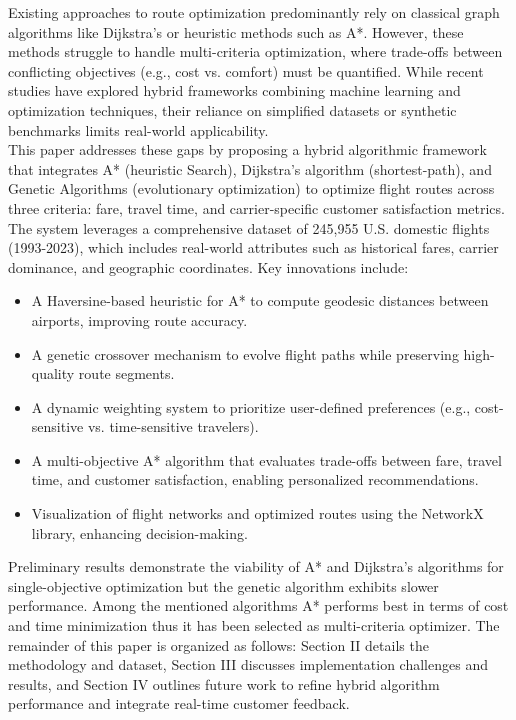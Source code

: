 \documentclass[conference]{IEEEtran}
\begin{document}
Existing approaches to route optimization predominantly rely on classical graph algorithms like Dijkstra's or heuristic methods such as A*. 
However, these methods struggle to handle multi-criteria optimization, where trade-offs between conflicting objectives (e.g., cost vs. comfort) must be quantified. 
While recent studies have explored hybrid frameworks combining machine learning and optimization techniques, their reliance on simplified datasets or synthetic benchmarks limits real-world applicability.\\

This paper addresses these gaps by proposing a hybrid algorithmic framework that integrates A* (heuristic Search), Dijkstra's algorithm (shortest-path), and Genetic Algorithms (evolutionary optimization) to optimize flight routes across three criteria: fare, travel time, and carrier-specific customer satisfaction metrics. 
The system leverages a comprehensive dataset of 245,955 U.S. domestic flights (1993-2023), which includes real-world attributes such as historical fares, carrier dominance, and geographic coordinates. 
Key innovations include:
\begin{itemize}
    \item A Haversine-based heuristic for A* to compute geodesic distances between airports, improving route accuracy.
    \item A genetic crossover mechanism to evolve flight paths while preserving high-quality route segments.
    \item A dynamic weighting system to prioritize user-defined preferences (e.g., cost-sensitive vs. time-sensitive travelers).
    \item A multi-objective A* algorithm that evaluates trade-offs between fare, travel time, and customer satisfaction, enabling personalized recommendations.
    \item Visualization of flight networks and optimized routes using the NetworkX library, enhancing decision-making.
\end{itemize}
Preliminary results demonstrate the viability of A* and Dijkstra's algorithms for single-objective optimization but the genetic algorithm exhibits slower performance. 
Among the mentioned algorithms A* performs best in terms of cost and time minimization thus it has been selected as multi-criteria optimizer. 
The remainder of this paper is organized as follows: Section II details the methodology and dataset, Section III discusses implementation challenges and results, and Section IV outlines future work to refine hybrid algorithm performance and integrate real-time customer feedback.
\end{document}
